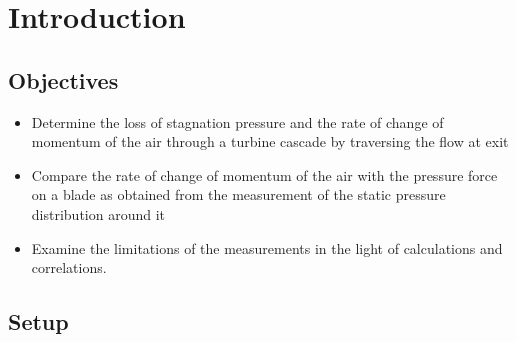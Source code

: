 \documentclass{article}
\begin{document}
\title{}
\author{lwp26}
\date{November 2024}
\maketitle 

\section{Introduction}

\subsection{Objectives}
\begin{itemize}
    \item Determine the loss of stagnation pressure and the rate of
    change of momentum of the air through a turbine
    cascade by traversing the flow at exit
    \item Compare the rate of change of momentum of the air with
    the pressure force on a blade as obtained from the
    measurement of the static pressure distribution around it
    \item Examine the limitations of the measurements in the light
    of calculations and correlations.
\end{itemize}

\subsection{Setup}
\end{document}
